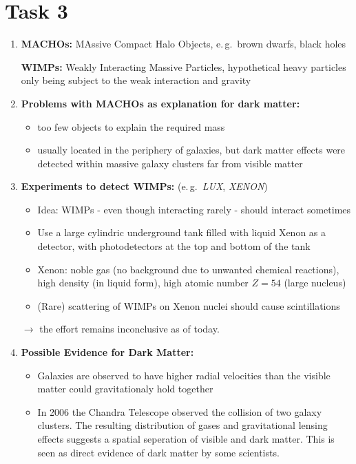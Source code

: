 \documentclass[11pt,a4paper]{scrartcl}
\newcommand{\eg}{e.\,g.}
\begin{document}
\section*{Task 3}

\begin{enumerate}[label=\textbf{\large(\alph*)}, itemsep=\baselineskip]

\item
    \textbf{MACHOs:} MAssive Compact Halo Objects, \eg~brown dwarfs, black
    holes

    \textbf{WIMPs:} Weakly Interacting Massive Particles, hypothetical heavy
    particles only being subject to the weak interaction and gravity


\item
    \textbf{Problems with MACHOs as explanation for dark matter:}
    \begin{itemize}
        \item too few objects to explain the required mass
        \item usually located in the periphery of galaxies, but dark matter
            effects were detected within massive galaxy clusters far from
            visible matter
    \end{itemize}


\item
    \textbf{Experiments to detect WIMPs:} (\eg~\emph{LUX}, \emph{XENON})
    \begin{itemize}
        \item Idea: WIMPs - even though interacting rarely - should interact
            sometimes
        \item Use a large cylindric underground tank filled with liquid Xenon
            as a detector, with photodetectors at the top and bottom of the
            tank
        \item Xenon: noble gas (no background due to unwanted chemical
            reactions), high density (in liquid form), high atomic number
            $Z=54$ (large nucleus)
        \item (Rare) scattering of WIMPs on Xenon nuclei should cause
            scintillations
    \end{itemize}
    $\to$ the effort remains inconclusive as of today.


\item
    \textbf{Possible Evidence for Dark Matter:}
        \begin{itemize}
            \item Galaxies are observed to have higher radial velocities than the
                visible matter could gravitationaly hold together
            \item In 2006 the Chandra Telescope observed the collision of two
                galaxy clusters. The resulting distribution of gases and
                gravitational lensing effects suggests a spatial seperation of
                visible and dark matter. This is seen as direct evidence of dark
                matter by some scientists.
        \end{itemize}


\end{enumerate}
\end{document}
